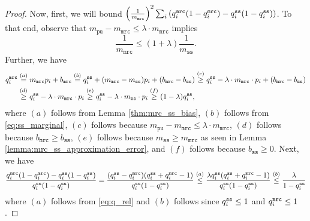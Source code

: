 \begin{proof}

Now, first, we will bound $\left(\frac{1}{m_\texttt{mrc}}\right)^2\sum_{i}\left( q^{\texttt{mrc}}_i (1-q^{\texttt{mrc}}_i) - q^{\texttt{ss}}_i (1-q^{\texttt{ss}}_i) \right)$. To that end, observe that $m_{\texttt{pu}} - m_\texttt{mrc} \leq \lambda \cdot m_\texttt{mrc}$ implies 
\begin{equation}\label{eq:m_hat_bdd_2}
    \frac{1}{m_\texttt{mrc}} \leq (1+\lambda)\frac{1}{m_{\texttt{ss}}}.
\end{equation} 
Further, we have
\begin{align}
q^{\texttt{mrc}}_i & \stackrel{(a)}{=} m_\texttt{mrc} p_i+b_\texttt{mrc} \stackrel{(b)}{=} q^{\texttt{ss}}_i + (m_\texttt{mrc}-m_\texttt{ss})p_i+(b_\texttt{mrc}-b_\texttt{ss}) \stackrel{(c)}{\geq} q^{\texttt{ss}}_i - \lambda \cdot m_\texttt{mrc} \cdot p_i +(b_\texttt{mrc}-b_\texttt{ss}) \\ & 
\stackrel{(d)}{\geq} q^{\texttt{ss}}_i - \lambda \cdot m_\texttt{mrc} \cdot p_i
\stackrel{(e)}{\geq} q^{\texttt{ss}}_i - \lambda \cdot m_\texttt{ss} \cdot p_i
\stackrel{(f)}{\geq} (1-\lambda)q^{\texttt{ss}}_i, \label{eq:q_rel}
\end{align}
where $(a)$ follows from Lemma \ref{thm:mrc_ss_bias}, $(b)$ follows from \eqref{eq:ss_marginal}, $(c)$ follows because $m_{\texttt{pu}} - m_\texttt{mrc} \leq \lambda \cdot m_\texttt{mrc}$, $(d)$ follows because $b_\texttt{mrc} \geq b_\texttt{ss}$, $(e)$ follows because $m_\texttt{ss} \geq m_\texttt{mrc}$ as seen in Lemma \ref{lemma:mrc_ss_approximation_error}, and $(f)$ follows because $b_\texttt{ss} \geq 0$. Next, we have
\begin{align}
    \frac{q^{\texttt{mrc}}_i(1-q^{\texttt{mrc}}_i) - q^{\texttt{ss}}_i(1-q^{\texttt{ss}}_i)}{q^{\texttt{ss}}_i(1-q^{\texttt{ss}}_i)} 
     = \frac{(q^{\texttt{ss}}_i - q^{\texttt{mrc}}_i)(q^{\texttt{ss}}_i+q^{\texttt{mrc}}_i -1)}{q^{\texttt{ss}}_i(1-q^{\texttt{ss}}_i)} 
     \stackrel{(a)}{\leq} \frac{\lambda q^{\texttt{ss}}_i(q^{\texttt{ss}}_i+q^{\texttt{mrc}}_i-1)}{q^{\texttt{ss}}_i(1-q^{\texttt{ss}}_i)}
     \stackrel{(b)}{\leq} \frac{\lambda }{1-q^{\texttt{ss}}_i} \label{eq:mrc_ss_inter1}
\end{align}
where $(a)$ follows from \eqref{eq:q_rel} and $(b)$ follows since $q^{\texttt{ss}}_i \leq 1$ and $q^{\texttt{mrc}}_i \leq 1$.


\end{proof}

